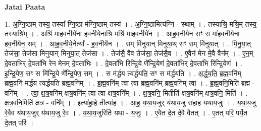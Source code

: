 \documentclass[17pt]{extarticle}
\begin{document}
\textbf{Jatai Paata} \newline

1. अ॒ग्नि॒ष्ठाम् तस्य॒ तस्या᳚ ग्नि॒ष्ठा म॑ग्नि॒ष्ठाम् तस्य॑ । . अ॒ग्नि॒ष्ठामित्य॑ग्नि - स्थाम् । . तस्याश्रि॒ मश्रि॒म् तस्य॒ तस्याश्रि᳚म् । . अश्रि॑ माहव॒नीये॑ना हव॒नीये॒नाश्रि॒ मश्रि॑ माहव॒नीये॑न । . आ॒ह॒व॒नीये॑न॒ सꣳ स मा॑हव॒नीये॑ना हव॒नीये॑न॒ सम् । . आ॒ह॒व॒नीये॒नेत्या᳚ - ह॒व॒नीये॑न । . सम् मि॑नुयान् मिनुया॒थ् सꣳ सम् मि॑नुयात् । . मि॒नु॒या॒त् तेज॑सा॒ तेज॑सा मिनुयान् मिनुया॒त् तेज॑सा । . तेज॑सै॒ वैव तेज॑सा॒ तेज॑सै॒व । . ए॒वैन॑ मेन मे॒वै वैन᳚म् । . ए॒न॒म् दे॒वता॑भिर् दे॒वता॑भि रेन मेनम् दे॒वता॑भिः । . दे॒वता॑भि रिन्द्रि॒ये णे᳚न्द्रि॒येण॑ दे॒वता॑भिर् दे॒वता॑भि रिन्द्रि॒येण॑ । . इ॒न्द्रि॒येण॒ सꣳ स मि॑न्द्रि॒ये णे᳚न्द्रि॒येण॒ सम् । . स म॑र्द्धय त्यर्द्धयति॒ सꣳ स म॑र्द्धयति । . अ॒र्द्ध॒य॒ति॒ ब्र॒ह्म॒वनि॑म् ब्रह्म॒वनि॑ मर्द्धय त्यर्द्धयति ब्रह्म॒वनि᳚म् । . ब्र॒ह्म॒वनि॑म् त्वा त्वा ब्रह्म॒वनि॑म् ब्रह्म॒वनि॑म् त्वा । . ब्र॒ह्म॒वनि॒मिति॑ ब्रह्म - वनि᳚म् । . त्वा॒ क्ष॒त्र॒वनि॑म् क्षत्र॒वनि॑म् त्वा त्वा क्षत्र॒वनि᳚म् । . क्ष॒त्र॒वनि॒ मितीति॑ क्षत्र॒वनि॑म् क्षत्र॒वनि॒ मिति॑ । . क्ष॒त्र॒वनि॒मिति॑ क्षत्र - वनि᳚म् । . इत्या॑हा॒हे तीत्या॑ह । . आ॒ह॒ य॒था॒य॒जुर् य॑थाय॒जु रा॑हाह यथाय॒जुः । . य॒था॒य॒जु रे॒वैव य॑थाय॒जुर् य॑थाय॒जु रे॒व । . य॒था॒य॒जुरिति॑ यथा - य॒जुः । . ए॒वैत दे॒त दे॒वै वैतत् । . ए॒तत् परि॒ पर्ये॒त दे॒तत् परि॑ । \newline
\end{document}
